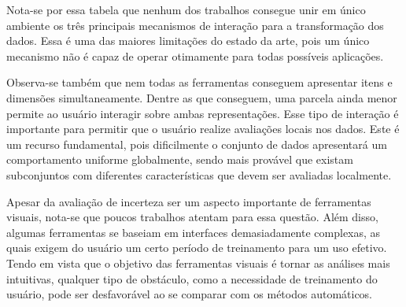 Nota-se por essa tabela que nenhum dos trabalhos consegue
unir em único ambiente os três principais mecanismos de
interação para a transformação dos dados. Essa é uma das
maiores limitações do estado da arte, pois um único
mecanismo não é capaz de operar otimamente para todas
possíveis aplicações. 

Observa-se também que nem todas as ferramentas conseguem
apresentar itens e dimensões simultaneamente. Dentre as que
conseguem, uma parcela ainda menor permite ao usuário
interagir sobre ambas representações. Esse tipo de interação
é importante para permitir que o usuário realize avaliações
locais nos dados. Este é um recurso fundamental, pois
dificilmente o conjunto de dados apresentará um
comportamento uniforme globalmente, sendo mais provável que
existam subconjuntos com diferentes características que
devem ser avaliadas localmente.

Apesar da avaliação de incerteza ser um aspecto importante 
de ferramentas visuais, nota-se que poucos trabalhos 
atentam para essa questão. Além disso, algumas ferramentas se
baseiam em interfaces demasiadamente complexas, as quais
exigem do usuário um certo período de treinamento para um
uso efetivo. Tendo em vista que o objetivo das ferramentas
visuais é tornar as análises mais intuitivas, qualquer tipo
de obstáculo, como a necessidade de treinamento do usuário,
pode ser desfavorável ao se comparar com os métodos
automáticos.

\newcommand{\redc}{\cellcolor{red!25}Não}
\newcommand{\greenc}{\cellcolor{green!25}Sim}

